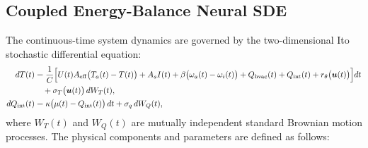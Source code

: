 \documentclass[11pt,letterpaper]{article}
\begin{document}
\subsection{Coupled Energy-Balance Neural SDE}
\label{sec:model-sde}
The continuous-time system dynamics are governed by the two-dimensional Ito stochastic differential equation:
\begin{align}
\label{eq:sdeT}
dT(t) &= \frac{1}{C}\Bigl[ U(t)A_\mathrm{eff}\bigl(T_a(t) - T(t)\bigr) + A_s I(t) + \beta\bigl(\omega_a(t) - \omega_i(t)\bigr) + Q_\mathrm{hvac}(t) + Q_\mathrm{int}(t) + r_\theta\bigl(\bm{u}(t)\bigr) \Bigr]dt \nonumber \\
&\quad + \sigma_T\bigl(\bm{u}(t)\bigr)\,dW_T(t), \\
\label{eq:sdeQ}
dQ_\mathrm{int}(t) &= \kappa\bigl(\mu(t) - Q_\mathrm{int}(t)\bigr)\,dt + \sigma_q\,dW_Q(t),
\end{align}
where $W_T(t)$ and $W_Q(t)$ are mutually independent standard Brownian motion processes. The physical components and parameters are defined as follows:
\end{document}
